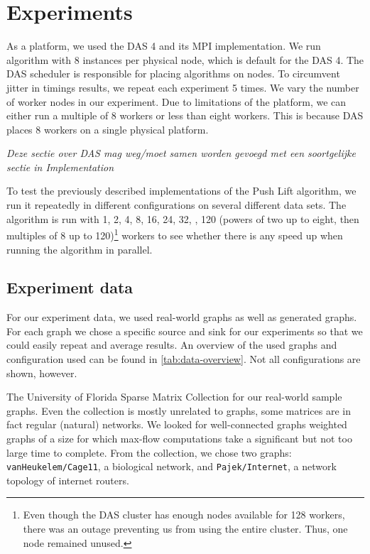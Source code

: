 \chapter{Experiments}
\label{chp:experiments}

As a platform, we used the DAS 4 and its MPI implementation. We run algorithm with 8 instances per physical node, which is default for the DAS 4. %
The DAS scheduler is responsible for placing algorithms on nodes. To circumvent jitter in timings results, we repeat each experiment 5 times. We vary the number of worker nodes in our experiment. Due to limitations of the platform, we can either run a multiple of 8 workers or less than eight workers. This is because DAS places 8 workers on a single physical platform.

\emph{Deze sectie over DAS mag weg/moet samen worden gevoegd met een soortgelijke sectie in Implementation}

To test the previously described implementations of the Push Lift algorithm, we run it repeatedly in different configurations on several different data sets. The algorithm is run with 1, 2, 4, 8, 16, 24, 32, \textellipsis, 120 (powers of two up to eight, then multiples of 8 up to 120)\footnote{Even though the DAS cluster has enough nodes available for 128 workers, there was an outage preventing us from using the entire cluster. Thus, one node remained unused.} workers to see whether there is any speed up when running the algorithm in parallel.

\section{Experiment data}
For our experiment data, we used real-world graphs as well as generated graphs. For each graph we chose a specific source and sink for our experiments so that we could easily repeat and average results. An overview of the used graphs and configuration used can be found in \autoref{tab:data-overview}. Not all configurations are shown, however.

The University of Florida Sparse Matrix Collection \cite{FloridaSparseMatrix} for our real-world sample graphs. Even the collection is mostly unrelated to graphs, some matrices are in fact regular (natural) networks. We looked for well-connected graphs weighted graphs of a size for which max-flow computations take a significant but not too large time to complete. From the collection, we chose two graphs: \texttt{vanHeukelem/Cage11}, a biological network, and \texttt{Pajek/Internet}, a network topology of internet routers.

